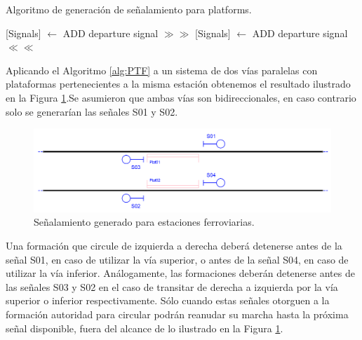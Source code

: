     \begin{algorithm}[hbt!]
        \caption{Algoritmo de generación de señalamiento para platforms.}\label{alg:PTF}
        \DontPrintSemicolon
        \SetNoFillComment
        \LinesNotNumbered 
        {
            [Signals] $\gets$ ADD departure signal $\gg\gg$\;
            [Signals] $\gets$ ADD departure signal $\ll\ll$\;
        }
        \KwResult{[Signals]} 
    \end{algorithm}

    Aplicando el Algoritmo \ref{alg:PTF} a un sistema de dos vías paralelas con plataformas pertenecientes a la misma estación obtenemos el resultado ilustrado en la Figura \ref{fig:signal_platform}.Se asumieron que ambas vías son bidireccionales, en caso contrario solo se generarían las señales S01 y S02.
    
    \begin{figure}[h!]
        \centering
        \includegraphics[width=1\textwidth]{Figuras/platforms.PNG}
        \centering\caption{Señalamiento generado para estaciones ferroviarias.}
        \label{fig:signal_platform}
    \end{figure}
    
    Una formación que circule de izquierda a derecha deberá detenerse antes de la señal S01, en caso de utilizar la vía superior, o antes de la señal S04, en caso de utilizar la vía inferior. Análogamente, las formaciones deberán detenerse antes de las señales S03 y S02 en el caso de transitar de derecha a izquierda por la vía superior o inferior respectivamente. Sólo cuando estas señales otorguen a la formación autoridad para circular podrán reanudar su marcha hasta la próxima señal disponible, fuera del alcance de lo ilustrado en la Figura \ref{fig:signal_platform}.